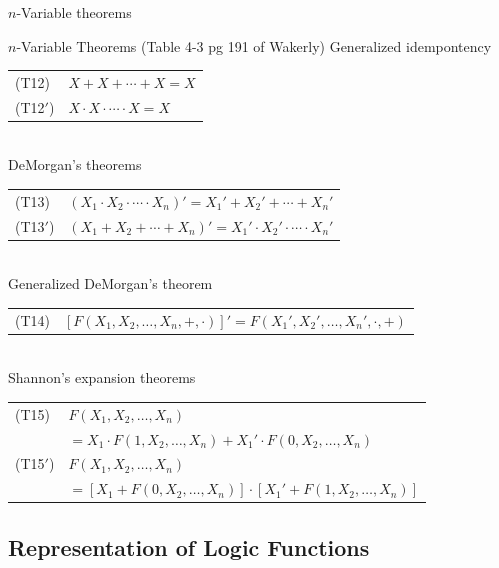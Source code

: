 \begin{frame}{$n$-Variable theorems}
  \begin{block}{$n$-Variable Theorems (Table 4-3 pg 191 of Wakerly)}
    Generalized idempontency \\
    \begin{tabular}{ll}
      (T12) & $X + X + \cdots + X = X$ \\
      (T12$'$) & $X \cdot X \cdot \cdots \cdot X = X$ \\
    \end{tabular} \\
    DeMorgan's theorems \\
    \begin{tabular}{ll}
      (T13) & $(X_1 \cdot X_2 \cdot \cdots \cdot X_n)' = X_1' + X_2' + \cdots + X_n'$ \\
      (T13$'$) & $(X_1 + X_2 + \cdots + X_n)' = X_1' \cdot X_2' \cdot \cdots \cdot X_n'$ \\
    \end{tabular} \\
    Generalized DeMorgan's theorem \\
    \begin{tabular}{ll}
      (T14) & $[F(X_1, X_2, \ldots, X_n, +, \cdot)]' = F(X_1', X_2', \ldots, X_n', \cdot, +)$ \\
    \end{tabular} \\
    Shannon's expansion theorems \\
    \begin{tabular}{ll}
      (T15) & $F(X_1, X_2, \ldots, X_n)$ \\ 
            & $= X_1 \cdot F(1, X_2, \ldots, X_n) + X_1' \cdot F(0, X_2, \ldots, X_n)$ \\
      (T15$'$) & $F(X_1, X_2, \ldots, X_n)$ \\ 
               & $= [X_1 + F(0, X_2, \ldots, X_n)] \cdot [X_1' + F(1, X_2, \ldots, X_n)]$ \\
    \end{tabular}
  \end{block}
\end{frame}

\subsection{Representation of Logic Functions}

